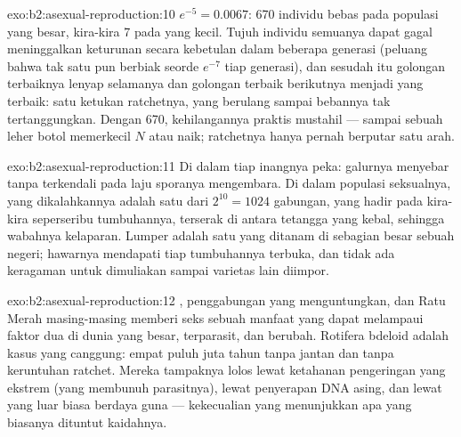 \begin{solution}{exo:b2:asexual-reproduction:10}
$e^{-5} = 0.0067$: 670 individu bebas  pada populasi yang besar,
kira-kira 7 pada yang kecil. Tujuh individu semuanya dapat gagal
meninggalkan keturunan secara kebetulan dalam beberapa generasi
(peluang bahwa tak satu pun berbiak seorde $e^{-7}$ tiap generasi), dan
sesudah itu golongan terbaiknya lenyap selamanya dan golongan
terbaik berikutnya menjadi yang terbaik: satu ketukan ratchetnya, yang
berulang sampai bebannya tak tertanggungkan. Dengan 670, kehilangannya
praktis mustahil --- sampai sebuah leher botol memerkecil $N$ atau  naik; ratchetnya hanya pernah berputar satu arah.
\end{solution}

\begin{solution}{exo:b2:asexual-reproduction:11}
Di dalam  tiap inangnya peka: galurnya menyebar tanpa terkendali
pada laju sporanya mengembara. Di dalam populasi seksualnya, 
yang dikalahkannya adalah satu dari $2^{10} = 1024$ gabungan, yang
hadir pada kira-kira seperseribu tumbuhannya, terserak di antara
tetangga yang kebal, sehingga wabahnya kelaparan. Lumper adalah satu
 yang ditanam di sebagian besar sebuah negeri; hawarnya mendapati
tiap tumbuhannya terbuka, dan tidak ada keragaman untuk dimuliakan
sampai varietas lain diimpor.
\end{solution}

\begin{solution}{exo:b2:asexual-reproduction:12}
, penggabungan  yang menguntungkan, dan Ratu Merah
masing-masing memberi seks sebuah manfaat yang dapat melampaui faktor
dua di dunia yang besar, terparasit, dan berubah. Rotifera bdeloid
adalah kasus yang canggung: empat puluh juta tahun tanpa jantan dan
tanpa keruntuhan ratchet. Mereka tampaknya lolos lewat ketahanan
pengeringan yang ekstrem (yang membunuh parasitnya), lewat penyerapan
DNA asing, dan lewat  yang luar biasa berdaya guna ---
kekecualian yang menunjukkan apa yang biasanya dituntut kaidahnya.
\end{solution}

